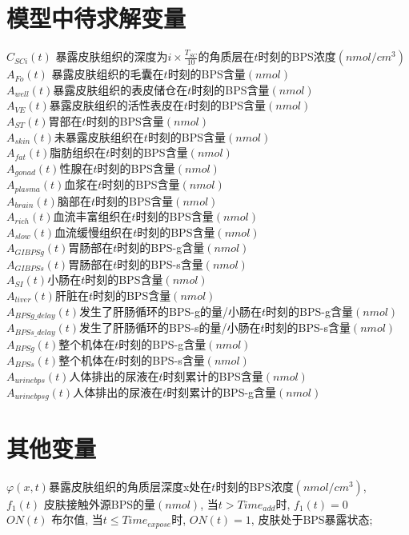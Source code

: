 \documentclass[a4paper,punct=banjiao,twoside]{ctexrep}
\theoremstyle{plain}
\theoremstyle{definition}
\theoremstyle{remark}
\begin{document}
\section*{模型中待求解变量}
\label{app:B}
\noindent$C_{SCi}(t)$  {\hfill 暴露皮肤组织的深度为$i\times \frac{T_{SC}}{10}$的角质层在$t$时刻的BPS浓度$(nmol/cm^3)$}\\
$A_{Fo}(t)$ {\hfill  暴露皮肤组织的毛囊在$t$时刻的BPS含量$(nmol)$}\\
$A_{well}(t)${\hfill 暴露皮肤组织的表皮储仓在$t$时刻的BPS含量$(nmol)$}\\
$A_{VE}(t)${\hfill 暴露皮肤组织的活性表皮在$t$时刻的BPS含量$(nmol)$}\\
$A_{ST}(t)${\hfill 胃部在$t$时刻的BPS含量$(nmol)$}\\
$A_{skin}(t)${\hfill 未暴露皮肤组织在$t$时刻的BPS含量$(nmol)$}\\
$A_{fat}(t)${\hfill 脂肪组织在$t$时刻的BPS含量$(nmol)$}\\
$A_{gonad}(t)${\hfill 性腺在$t$时刻的BPS含量$(nmol)$}\\
$A_{plasma}(t)${\hfill 血浆在$t$时刻的BPS含量$(nmol)$}\\
$A_{brain}(t)${\hfill 脑部在$t$时刻的BPS含量$(nmol)$}\\
$A_{rich}(t)${\hfill 血流丰富组织在$t$时刻的BPS含量$(nmol)$}\\
$A_{slow}(t)${\hfill 血流缓慢组织在$t$时刻的BPS含量$(nmol)$}\\
$A_{GIBPSg}(t)${\hfill 胃肠部在$t$时刻的BPS-g含量$(nmol)$}\\
$A_{GIBPSs}(t)${\hfill 胃肠部在$t$时刻的BPS-s含量$(nmol)$}\\
$A_{SI}(t)${\hfill 小肠在$t$时刻的BPS含量$(nmol)$}\\
$A_{liver}(t)${\hfill 肝脏在$t$时刻的BPS含量$(nmol)$}\\
$A_{BPSg\_delay}(t)${\hfill 发生了肝肠循环的BPS-g的量/小肠在$t$时刻的BPS-g含量$(nmol)$}\\
$A_{BPSs\_delay}(t)${\hfill 发生了肝肠循环的BPS-s的量/小肠在$t$时刻的BPS-s含量$(nmol)$}\\
$A_{BPSg}(t)${\hfill 整个机体在$t$时刻的BPS-g含量$(nmol)$}\\
$A_{BPSs}(t)${\hfill 整个机体在$t$时刻的BPS-s含量$(nmol)$}\\
$A_{urinebps}(t)${\hfill 人体排出的尿液在$t$时刻累计的BPS含量$(nmol)$}\\
$A_{urinebpsg}(t)${\hfill  人体排出的尿液在$t$时刻累计的BPS-g含量$(nmol)$}
\section*{其他变量}
\noindent$\varphi(x,t)${\hfill   暴露皮肤组织的角质层深度x处在$t$时刻的BPS浓度$(nmol/cm^3)$,}\\
$f_1(t)$ {\hfill  皮肤接触外源BPS的量$(nmol)$, 当$t> Time_{add}$时, $f_1(t)=0$}\\
$ON(t)$ {\hfill  布尔值, 当$t\leq Time_{expose}$时, $ON(t)=1$, 皮肤处于BPS暴露状态;}
\end{document}
